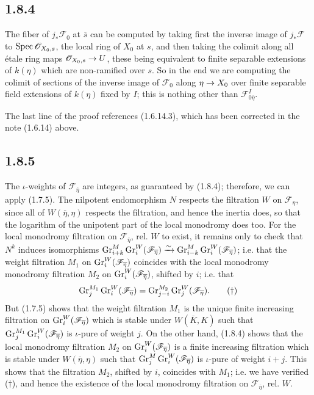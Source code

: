 \documentclass[deligne.tex]{subfiles}
\begin{document}
\subsection*{1.8.4} The fiber of $j_\ast\mathscr F_0$ at $\overline s$
can be computed by taking first the inverse image of $j_\ast\mathscr F$ to
$\operatorname{Spec}\mathscr O_{X_0,s}$, the local ring of $X_0$ at $s$, and then taking
the colimit along all étale ring maps $\mathscr O_{X_0,s}\rightarrow U$, these being
equivalent to finite separable extensions of $k(\eta)$ which are
non-ramified over $s$. So in the end we are computing the colimit of 
sections of the inverse image of $\mathscr F_0$ along $\eta\rightarrow X_0$
over finite separable field extensions of $k(\eta)$ fixed by $I$; this is
nothing other than $\mathscr F_{0\overline\eta}^I$.

The last line of the proof references (1.6.14.3), which has been corrected
in the note (1.6.14) above.

\subsection*{1.8.5}
The $\iota$-weights of $\mathscr F_{\overline\eta}$ are 
integers, as guaranteed by (1.8.4); therefore, we can apply (1.7.5).
The nilpotent endomorphism $N$ respects the filtration $W$ on
$\mathscr F_{\eta}$, since all of $W(\overline\eta,\eta)$ respects the
filtration, and hence the inertia does, so that the logarithm of the
unipotent part of the local monodromy does too. For the local monodromy 
filtration on $\mathscr F_{\overline\eta}$, rel. $W$ to exist, it remains 
only to check that $N^k$ induces isomorphisms
$\operatorname{Gr}_{i+k}^M\operatorname{Gr}_i^W(\mathscr F_{\overline\eta})\xrightarrow{\sim}
\operatorname{Gr}_{i-k}^M\operatorname{Gr}_i^W(\mathscr F_{\overline\eta})$; i.e. that the weight
filtration $M_1$ on $\operatorname{Gr}_i^W(\mathscr F_{\overline\eta})$ coincides with the 
local monodromy monodromy filtration $M_2$ on 
$\operatorname{Gr}_i^W(\mathscr F_{\overline\eta})$, shifted by $i$; i.e. that
\begin{equation*}
\operatorname{Gr}_j^{M_1}\operatorname{Gr}_i^W(\mathscr F_{\overline\eta})=
\operatorname{Gr}_{j-i}^{M_2}\operatorname{Gr}_j^W(\mathscr F_{\overline\eta}).\tag{$\dagger$}
\end{equation*}
But (1.7.5) shows that the weight filtration $M_1$ is the unique finite
increasing filtration on $\operatorname{Gr}_i^W(\mathscr F_{\overline\eta})$ which is 
stable under $W(\overline K,K)$ such that
$\operatorname{Gr}_j^{M_1}\operatorname{Gr}_i^W(\mathscr F_{\overline\eta})$ is $\iota$-pure of weight $j$.
On the other hand, (1.8.4) shows that the local monodromy filtration $M_2$
on $\operatorname{Gr}_i^W(\mathscr F_{\overline\eta})$ is a finite increasing filtration
which is stable under $W(\overline\eta,\eta)$ such that 
$\operatorname{Gr}_j^M\operatorname{Gr}_i^W(\mathscr F_{\overline\eta})$ is $\iota$-pure of weight $i+j$.
This shows that the filtration $M_2$, shifted by $i$, coincides with $M_1$;
i.e. we have verified ($\dagger$), and hence the existence of the
local monodromy filtration on $\mathscr F_{\overline\eta}$, rel. $W$.
\end{document}
